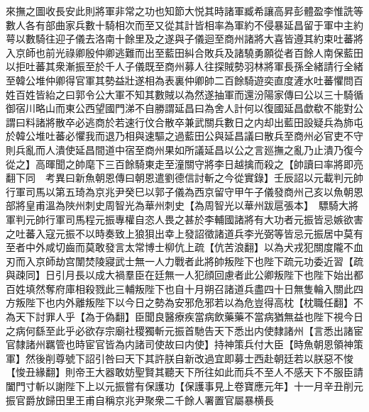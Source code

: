 來撫之圖收長安此則將軍非常之功也知節大悦其時諸軍臧希讓高昇彭體盈李惟詵等數人各有部曲家兵數十騎相次而至又從其計皆相率為軍約不侵暴延昌留于軍中主約萼以數騎往迎子儀去洛南十餘里及之遂與子儀迴至商州諸將大喜皆遵其約束吐蕃將入京師也前光祿卿殷仲卿逃難而出至藍田糾合敗兵及諸驍勇願從者百餘人南保藍田以拒吐蕃其衆漸振至於千人子儀既至商州募人往探賊勢羽林將軍長孫全緒請行全緒至韓公堆仲卿得官軍其勢益壯遂相為表裏仲卿帥二百餘騎遊奕直度滻水吐蕃懼問百姓百姓皆紿之曰郭令公大軍不知其數賊以為然遂抽軍而還汾陽家傳曰公以三十騎循御宿川略山而東公西望國門涕不自勝謂延昌曰為舍人計何以復國延昌歔欷不能對公謂曰料諸將散卒必逃商於若速行伩合散卒兼武關兵數日之内却出藍田設疑兵為斾屯於韓公堆吐蕃必懼我而退乃相與速驅之過藍田公與延昌議曰散兵至商州必官吏不守則兵亂而人潰使延昌間道中宿至商州果如所議延昌以公之言廵撫之亂乃止潰乃復今從之】高暉聞之帥麾下三百餘騎東走至潼關守將李日越擒而殺之【帥讀曰率將即亮翻下同　考異曰新魚朝恩傳曰朝恩遣劉德信討斬之今從實錄】壬辰詔以元載判元帥行軍司馬以第五琦為京兆尹癸巳以郭子儀為西京留守甲午子儀發商州己亥以魚朝恩部將皇甫溫為陜州刺史周智光為華州刺史【為周智光以華州跋扈張本】　驃騎大將軍判元帥行軍司馬程元振專權自恣人畏之甚於李輔國諸將有大功者元振皆忌嫉欲害之吐蕃入寇元振不以時奏致上狼狽出幸上發詔徵諸道兵李光弼等皆忌元振居中莫有至者中外咸切齒而莫敢發言太常博士柳伉上疏【伉苦浪翻】以為犬戎犯關度隴不血刃而入京師劫宫闈焚陵寢武士無一人力戰者此將帥叛陛下也陛下疏元功委近習【疏與疎同】日引月長以成大禍羣臣在廷無一人犯顔回慮者此公卿叛陛下也陛下始出都百姓填然奪府庫相殺戮此三輔叛陛下也自十月朔召諸道兵盡四十日無隻輪入關此四方叛陛下也内外離叛陛下以今日之勢為安邪危邪若以為危豈得高枕【枕職任翻】不為天下討罪人乎【為于偽翻】臣聞良醫療疾當病飲藥藥不當病猶無益也陛下視今日之病何繇至此乎必欲存宗廟社稷獨斬元振首馳告天下悉出内使隸諸州【言悉出諸宦官隸諸州羈管也時宦官皆為内諸司使故曰内使】持神策兵付大臣【時魚朝恩領神策軍】然後削尊號下詔引咎曰天下其許朕自新改過宜即募士西赴朝廷若以朕惡不悛【悛丑緣翻】則帝王大器敢妨聖賢其聽天下所往如此而兵不至人不感天下不服臣請闔門寸斬以謝陛下上以元振嘗有保護功【保護事見上卷寶應元年】十一月辛丑削元振官爵放歸田里王甫自稱京兆尹聚衆二千餘人署置官屬暴横長

